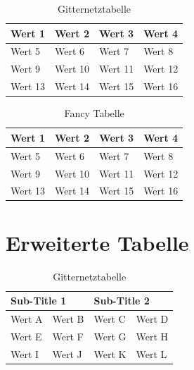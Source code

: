 \documentclass{scrreprt}
\begin{document}
			\begin{table}[htbp]
				\caption{Gitternetztabelle}
				\label{tab:gitternetztabelle}
				\label { Tabelle 1.0}
				\centering
				\begin{tabular}{|l|l|l|l|}
					\hline
					Wert 1 & Wert 2 & Wert 3 & Wert 4 \\ \hline
					Wert 5 & Wert 6 & Wert 7 & Wert 8 \\ \hline
					Wert 9 & Wert 10 & Wert 11 & Wert 12  \\ \hline
					Wert 13 & Wert 14 & Wert 15 & Wert 16  \\ \hline
				\end{tabular}
				
			\end{table}
			
			\begin{table}[h!]
				\centering
				\caption{Fancy Tabelle}
				\label{tab:fancytabelle}
			
				\begin{tabular}{llll}
					Wert 1  & Wert 2   & Wert 3  & Wert 4  \\ \hline
					Wert 5  &  Wert 6  & Wert 7  & Wert 8  \\ \hline
					Wert 9  &  Wert 10 & Wert 11 & Wert 12 \\ \hline
					Wert 13 & Wert 14  & Wert 15  & Wert 16 \\ \hline
				\end{tabular}
			\end{table}



		\section{Erweiterte Tabelle}
		\label{se:erwtabelle}

		\begin{table}[htbp]
			\caption{Gitternetztabelle}
			\label{tab:multigitternetz}
			\label { Tabelle 1.0}
			\centering
			\begin{tabular}{|l|l|l|l|}
				\hline
				\multicolumn{2}{|l|}{Sub-Title 1} & \multicolumn{2}{l|}{Sub-Title 2} \\ \hline
				Wert A          & Wert B          & Wert C          & Wert D         \\ \hline
				Wert E          & Wert F          & Wert G          & Wert H         \\ \hline
				Wert I          & Wert J          & Wert K          & Wert L         \\ \hline
			\end{tabular}
		\end{table}
		
\end{document}
